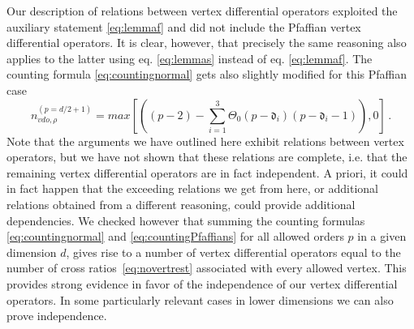 \documentclass{article}
\def\dep{\mathfrak{d}}
\begin{document}
Our description of relations between vertex differential operators exploited the 
auxiliary statement \eqref{eq:lemmaf} and did not include the Pfaffian vertex 
differential operators. It is clear, however, that precisely the same reasoning 
also applies to the latter using eq. \eqref{eq:lemmas} instead of eq. \eqref{eq:lemmaf}. The counting formula \eqref{eq:countingnormal} gets also slightly modified for this Pfaffian case
\begin{equation}
    n_{vdo,\rho}^{(p=d/2+1)}=\textit{max}\left[\left((p-2)-\sum_{i=1}^3\Theta_0(p-\dep_i)(p-\dep_i-1)\right),0\right]\,.
    \label{eq:countingPfaffians}
\end{equation}
Note that the arguments we have outlined here exhibit relations between vertex 
operators, but we have not shown that these relations are complete, i.e. that the 
remaining vertex differential operators are in fact independent. A priori, it could 
in fact happen that the exceeding relations we get from here, or additional relations 
obtained from a different reasoning, could provide additional dependencies. We checked however that summing the counting formulas \eqref{eq:countingnormal} and \eqref{eq:countingPfaffians} for all allowed orders $p$ in a given dimension $d$, gives rise to a number of vertex differential operators equal to the number of cross ratios~\eqref{eq:novertrest} associated with every allowed vertex.
This provides strong evidence in favor of the independence of our vertex differential operators. In some particularly relevant cases in lower dimensions we can also prove independence. 
\medskip 
 
\end{document}
